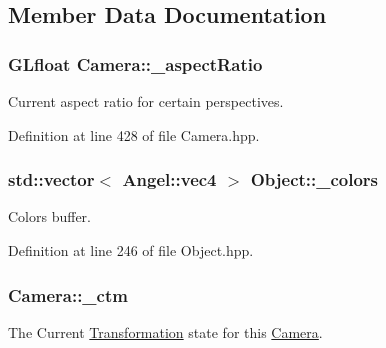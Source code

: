 \subsection{Member Data Documentation}
\hypertarget{class_camera_a42082e8f2d80a13674ce163d8e720bfb}{
\subsubsection[{\-\_\-aspect\-Ratio}]{\setlength{\rightskip}{0pt plus 5cm}G\-Lfloat Camera\-::\-\_\-aspect\-Ratio\hspace{0.3cm}{\ttfamily [private]}}}\label{class_camera_a42082e8f2d80a13674ce163d8e720bfb}


Current aspect ratio for certain perspectives. 



Definition at line 428 of file Camera.\-hpp.

\hypertarget{class_object_a29a0e9959c490067db69378bf57a17ba}{
\subsubsection[{\-\_\-colors}]{\setlength{\rightskip}{0pt plus 5cm}std\-::vector$<$ {\bf Angel\-::vec4} $>$ Object\-::\-\_\-colors\hspace{0.3cm}{\ttfamily [inherited]}}}\label{class_object_a29a0e9959c490067db69378bf57a17ba}


Colors buffer. 



Definition at line 246 of file Object.\-hpp.

\hypertarget{class_camera_a6c1e31c8470b923f9f872f73597cb95b}{
\subsubsection[{\-\_\-ctm}]{ Camera\-::\-\_\-ctm\hspace{0.3cm}{\ttfamily [private]}}}\label{class_camera_a6c1e31c8470b923f9f872f73597cb95b}


The Current \hyperlink{class_transformation}{Transformation} state for this \hyperlink{class_camera}{Camera}. 



